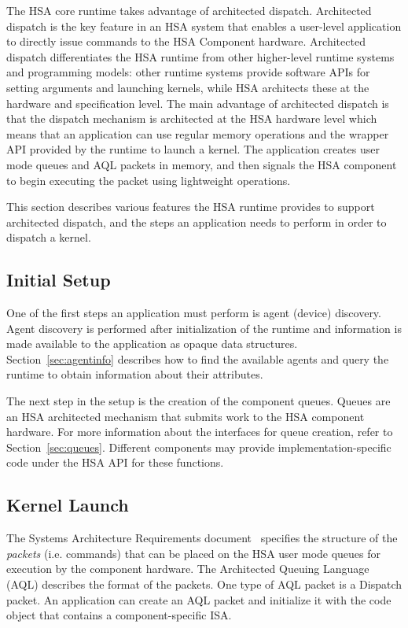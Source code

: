 \documentclass[final]{book}
\begin{document}
The HSA core runtime takes advantage of architected dispatch. Architected
dispatch is the key feature in an HSA system that enables a user-level
application to directly issue commands to the HSA Component hardware.
Architected dispatch differentiates the HSA runtime from other higher-level
runtime systems and programming models: other runtime systems provide
software APIs for setting arguments and launching kernels, while HSA architects
these at the hardware and specification level. The main advantage of architected
dispatch is that the dispatch mechanism is architected at the HSA hardware level
which means that an application can use regular memory operations and the
wrapper API provided by the runtime to launch a kernel. The application creates
user mode queues and AQL packets in memory, and then signals the HSA component
to begin executing the packet using lightweight operations.

This section describes various features the HSA runtime provides to support
architected dispatch, and the steps an application needs to perform in order to
dispatch a kernel.

\subsection{Initial Setup}
One of the first steps an application must perform is agent (device) discovery.
Agent discovery is performed after initialization of the runtime and information
is made available to the application as opaque data
structures. Section~\ref{sec:agentinfo} describes how to find the available
agents and query the runtime to obtain information about their attributes.

The next step in the setup is the creation of the component queues. Queues are an
HSA architected mechanism that submits work to the HSA component hardware. For
more information about the interfaces for queue creation, refer to
Section~\ref{sec:queues}. Different components may provide
implementation-specific code under the HSA API for these functions.


\subsection{Kernel Launch}
The Systems Architecture Requirements document~\cite{sar} specifies the
structure of the \emph{packets} (i.e. commands) that can be placed on the HSA
user mode queues for execution by the component hardware. The Architected
Queuing Language (AQL) describes the format of the packets. One type of
AQL packet is a Dispatch packet. An application can create an AQL packet
and initialize it with the code object that contains a component-specific ISA.
\end{document}
